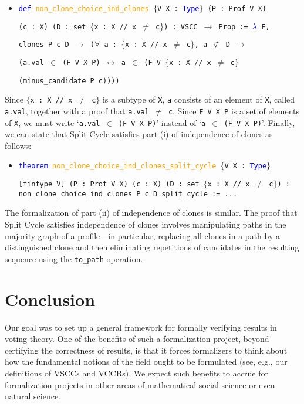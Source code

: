 \documentclass[runningheads]{llncs}
\begin{document}
\begin{itemize}
\item[] \texttt{\textcolor{blue}{def}   \textcolor{orange}{non\_clone\_choice\_ind\_clones} $\{$V X : \textcolor{blue}{Type}$\}$ (P : Prof V X)}

\texttt{(c : X) (D : set $\{$x : X // x $\neq$ c$\}$) : VSCC $\to$ Prop := \textcolor{blue}{$\lambda$} F, }

\texttt{clones P c D $\to$ ($\forall$  a : $\{$x : X // x $\neq$  c$\}$, a $\not\in$ D $\to$ }

\texttt{(a.val $\in$ (F V X P) $\leftrightarrow$ a $\in$ (F V $\{$x : X // x $\neq$ c$\}$} 

\texttt{(minus\_candidate P c))))}
\end{itemize}
Since \texttt{$\{$x : X // x $\neq$  c$\}$} is a subtype of \texttt{X},  \texttt{a} consists of an element of \texttt{X}, called \texttt{a.val}, together with a proof that \texttt{a.val $\neq$ c}. Since \texttt{F V X P} is a set of elements of \texttt{X}, we must write `\texttt{a.val $\in$ (F V X P)}' instead of `\texttt{a $\in$ (F V X P)}'. Finally, we can state that Split Cycle satisfies part (i) of independence of clones as follows:

\begin{itemize}
\item[] \texttt{\textcolor{blue}{theorem} \textcolor{orange}{non\_clone\_choice\_ind\_clones\_split\_cycle} $\{$V X : \textcolor{blue}{Type}$\}$}

\texttt{[fintype V] (P : Prof V X) (c : X) (D : set $\{$x : X // x $\neq$ c$\}$) : }
\texttt{non\_clone\_choice\_ind\_clones P c D split\_cycle := ...}
\end{itemize}
The formalization of part (ii) of independence of clones is similar. The proof that Split Cycle satisfies independence of clones involves manipulating paths in the majority graph of a profile---in particular, replacing all clones in a path by a distinguished clone and then eliminating repetitions of candidates in the resulting sequence using the \texttt{to\_path} operation.

\section{Conclusion}\label{Conclusion}

Our goal was to set up a general framework for formally verifying results in voting theory. One of the benefits of such a formalization project, beyond certifying the correctness of results, is that it forces formalizers to think about how the fundamental notions of the field ought to be formulated (see, e.g., our definitions of VSCCs and VCCRs). We expect such benefits to accrue for formalization projects in other areas of mathematical social science or even natural science.
\end{document}
